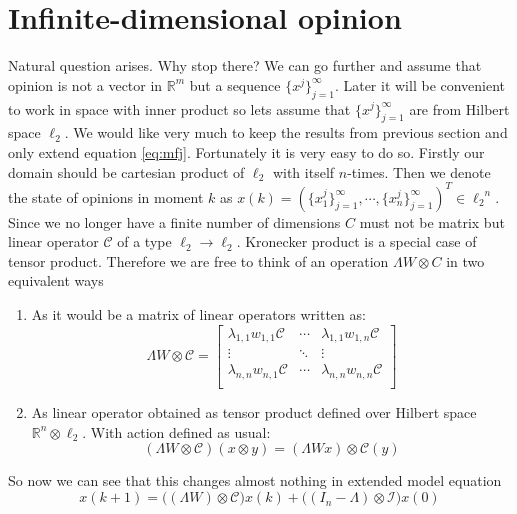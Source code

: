 \documentclass[leqno,12pt]{amsart}
\theoremstyle{remark}
\theoremstyle{remark}
\theoremstyle{remark}
\theoremstyle{definition}
\numberwithin{equation}{section}
\newcommand{\R}{\ensuremath{\mathbb{R}}}
\begin{document}
\section{Infinite-dimensional opinion}
Natural question arises. Why stop there? We can go further and assume that opinion is not a vector in $\R^m$ but a sequence $\{x^j\}_{j=1}^\infty$. Later it will be convenient to work in space with inner product so lets assume that $\{x^j\}_{j=1}^\infty$ are from Hilbert space $\ell_2$. We would like very much to keep the results from previous section and only extend equation \ref{eq:mfj}. Fortunately it is very easy to do so.
Firstly our domain should be cartesian product of $\ell_2$ with itself $n$-times.  Then we denote the state of opinions in moment $k$ as $x(k) = (\{x_1^j\}_{j=1}^\infty, \cdots ,\{x_n^j\}_{j=1}^\infty)^T \in {\ell_2}^n$.
Since we no longer have a finite number of dimensions $C$ must not be matrix but linear operator $\mathcal{C}$ of a type $\ell_2 \to \ell_2$. Kronecker product is a special case of tensor product. Therefore we are free to think of an operation $\Lambda W \otimes C$ in two equivalent ways
\begin{enumerate}
    \item As it would be a matrix of linear operators written as:
    \begin{equation*}\label{eq:1form}
        \Lambda W \otimes \mathcal{C} = \begin{bmatrix}
            \lambda_{1,1}w_{1,1}\mathcal{C} & \cdots & \lambda_{1,1}w_{1,n}\mathcal{C} \\
            \vdots & \ddots & \vdots\\
            \lambda_{n,n}w_{n,1}\mathcal{C} & \cdots & \lambda_{n,n}w_{n,n}\mathcal{C} \\
            \end{bmatrix}
    \end{equation*}
    \item As linear operator obtained as tensor product defined over Hilbert space $\R^n\otimes \ell_2$. With action defined as usual:
    \begin{equation*}
        (\Lambda W \otimes \mathcal{C})(x\otimes y) = (\Lambda Wx) \otimes \mathcal{C}(y)
    \end{equation*}
\end{enumerate}
So now we can see that this changes almost nothing in extended model equation
\begin{equation}\label{eq:model}
    x(k+1) = \big((\Lambda W)\otimes \mathcal{C}\big)x(k) + \big((I_n - \Lambda)\otimes \mathcal{I}\big)x(0)
\end{equation}
\end{document}
